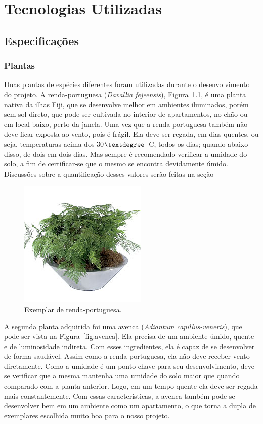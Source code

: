 \documentclass[a4paper,12pt]{report}
\begin{document}
\cleardoublepage
\chapter{Tecnologias Utilizadas}
	\label{cap:Tecnologias}
	\section{Especificações}
	
	\subsection{Plantas}
	Duas plantas de espécies diferentes foram utilizadas durante o desenvolvimento do projeto. A renda-portuguesa (\textit{Davallia fejeensis}), Figura~\ref{fig:renda}, é uma planta nativa da ilhas Fiji, que se desenvolve melhor em ambientes iluminados, porém sem sol direto, que pode ser cultivada no interior de apartamentos, no chão ou em local baixo, perto da janela. Uma vez que a renda-portuguesa também não deve ficar exposta ao vento, pois é frágil. Ela deve ser regada, em dias quentes, ou seja, temperaturas acima dos 30$\textdegree$~C, todos os dias; quando abaixo disso, de dois em dois dias. Mas sempre é recomendado verificar a umidade do solo, a fim de certificar-se que o mesmo se encontra devidamente úmido. Discussões sobre a quantificação desses valores serão feitas na seção %
		
\begin{figure}[!h]
	\centering
	\includegraphics[width=0.4\linewidth]{figs/renda}
	\caption{Exemplar de renda-portuguesa.}
	\label{fig:renda}
\end{figure}

	A segunda planta adquirida foi uma avenca (\textit{Adiantum capillus-veneris}), que pode ser vista na Figura~\ref{fig:avenca}. Ela precisa de um ambiente úmido, quente e de luminosidade indireta. Com esses ingredientes, ela é capaz de se desenvolver de forma saudável. Assim como a renda-portuguesa, ela não deve receber vento diretamente. Como a umidade é um ponto-chave para seu desenvolvimento, deve-se verificar que a mesma mantenha uma umidade do solo maior que quando comparado com a planta anterior. Logo, em um tempo quente ela deve ser regada mais constantemente. Com essas características, a avenca também pode se desenvolver bem em um ambiente como um apartamento, o que torna a dupla de exemplares escolhida muito boa para o nosso projeto. 
	
\end{document}
